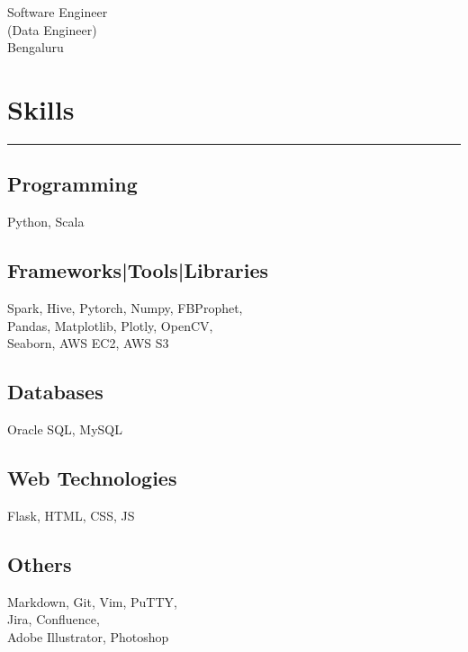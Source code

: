 \documentclass[]{puneet-resume}
\begin{document}
%
%

\begin{minipage}[t]{0.33\textwidth} 
\begin{large}
	\\
\end{large}
 \href{https://github.com/puneet29}{}  \href{https://www.linkedin.com/in/geekpuneet}{} \\
Software Engineer\\
(Data Engineer)\\
Bengaluru
\section{Skills}
\noindent\rule{5cm}{0.4pt}
\subsection{Programming}
Python, Scala
\vspace{6pt}
\subsection{Frameworks|Tools|Libraries}
Spark, Hive, Pytorch, Numpy, FBProphet,\\
Pandas, Matplotlib, Plotly, OpenCV,\\
Seaborn, AWS EC2, AWS S3
\vspace{6pt}
\subsection{Databases}
Oracle SQL, MySQL
\vspace{6pt}
\subsection{Web Technologies}
Flask, HTML, CSS, JS
\vspace{6pt}
\subsection{Others}
Markdown, Git, Vim, PuTTY,\\
Jira, Confluence,\\
Adobe Illustrator, Photoshop
\sectionsep

\end{minipage}
\end{document}

